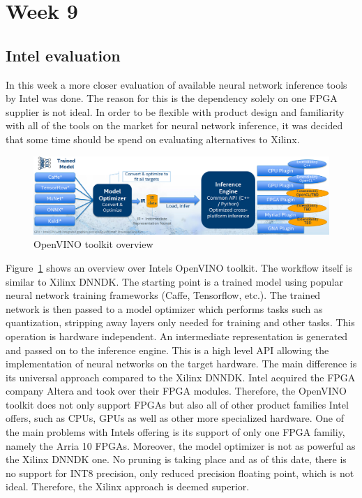 \section{Week 9}
\subsection{Intel evaluation}
In this week a more closer evaluation of available neural network inference tools by Intel was done. The reason for this is the dependency solely on one \ac{FPGA} supplier is not ideal. In order to be flexible with product design and familiarity with all of the tools on the market for neural network inference, it was decided that some time should be spend on evaluating alternatives to Xilinx.
\begin{figure}[!htb]
	\centering
		\includegraphics[width=\textwidth]{bilder/openVINO-overview.png}
		\caption{OpenVINO toolkit overview~\cite{openvino}}
		\label{fig:openvino}
\end{figure}
Figure~\ref{fig:openvino} shows an overview over Intels OpenVINO toolkit. The workflow itself is similar to Xilinx \ac{DNNDK}. The starting point is a trained model using popular neural network training frameworks (Caffe, Tensorflow, etc.). The trained network is then passed to a model optimizer which performs tasks such as quantization, stripping away layers only needed for training and other tasks. This operation is hardware independent. An intermediate representation is generated and passed on to the inference engine. This is a high level \ac{API} allowing the implementation of neural networks on the target hardware. The main difference is its universal approach compared to the Xilinx \ac{DNNDK}. Intel acquired the \ac{FPGA} company Altera and took over their \ac{FPGA} modules. Therefore, the OpenVINO toolkit does not only support \acp{FPGA} but also all of other product families Intel offers, such as \acp{CPU}, \acp{GPU} as well as other more specialized hardware. One of the main problems with Intels offering is its support of only one \ac{FPGA} familiy, namely the Arria 10 \acp{FPGA}. Moreover, the model optimizer is not as powerful as the Xilinx \ac{DNNDK} one. No pruning is taking place and as of this date, there is no support for INT8 precision, only reduced precision floating point, which is not ideal. Therefore, the Xilinx approach is deemed superior.
